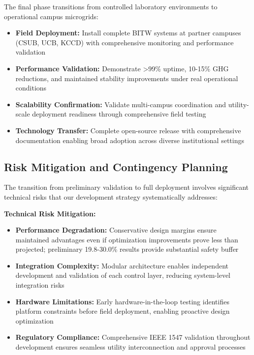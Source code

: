 \documentclass[12pt]{article}
\begin{document}
The final phase transitions from controlled laboratory environments to operational campus microgrids:

\begin{itemize}
\item \textbf{Field Deployment:} Install complete BITW systems at partner campuses (CSUB, UCB, KCCD) with comprehensive monitoring and performance validation
\item \textbf{Performance Validation:} Demonstrate >99\% uptime, 10-15\% GHG reductions, and maintained stability improvements under real operational conditions
\item \textbf{Scalability Confirmation:} Validate multi-campus coordination and utility-scale deployment readiness through comprehensive field testing
\item \textbf{Technology Transfer:} Complete open-source release with comprehensive documentation enabling broad adoption across diverse institutional settings
\end{itemize}

\subsection{Risk Mitigation and Contingency Planning}

The transition from preliminary validation to full deployment involves significant technical risks that our development strategy systematically addresses:

\textbf{Technical Risk Mitigation:}
\begin{itemize}
\item \textbf{Performance Degradation:} Conservative design margins ensure maintained advantages even if optimization improvements prove less than projected; preliminary 19.8-30.0\% results provide substantial safety buffer
\item \textbf{Integration Complexity:} Modular architecture enables independent development and validation of each control layer, reducing system-level integration risks
\item \textbf{Hardware Limitations:} Early hardware-in-the-loop testing identifies platform constraints before field deployment, enabling proactive design optimization
\item \textbf{Regulatory Compliance:} Comprehensive IEEE 1547 validation throughout development ensures seamless utility interconnection and approval processes
\end{itemize}
\end{document}
